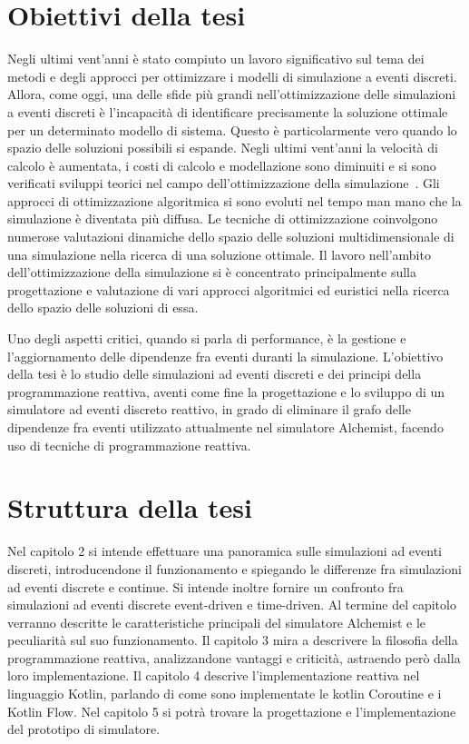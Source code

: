 \documentclass[12pt,a4paper,openright,twoside]{book}
\begin{document}
\section{Obiettivi della tesi}
Negli ultimi vent'anni è stato compiuto un lavoro significativo sul tema dei metodi e degli approcci per ottimizzare i modelli di simulazione a eventi discreti. Allora, come oggi, una delle sfide più grandi nell'ottimizzazione delle simulazioni a eventi discreti è l'incapacità di identificare precisamente la soluzione ottimale per un determinato modello di sistema. Questo è particolarmente vero quando lo spazio delle soluzioni possibili si espande.
Negli ultimi vent'anni la velocità di calcolo è aumentata, i costi di calcolo e modellazione sono diminuiti e si sono verificati sviluppi teorici nel campo dell'ottimizzazione della simulazione~\cite{DBLP:conf/scsc/Riley13}.
Gli approcci di ottimizzazione algoritmica si sono evoluti nel tempo man mano che la simulazione è diventata più diffusa. Le tecniche di ottimizzazione coinvolgono numerose valutazioni dinamiche dello spazio delle soluzioni multidimensionale di una simulazione nella ricerca di una soluzione ottimale. Il lavoro nell'ambito dell'ottimizzazione della simulazione si è concentrato principalmente sulla progettazione e valutazione di vari approcci algoritmici ed euristici nella ricerca dello spazio delle soluzioni di essa.

Uno degli aspetti critici, quando si parla di performance, è la gestione e l'aggiornamento delle dipendenze fra eventi duranti la simulazione. 
L'obiettivo della tesi è lo studio delle simulazioni ad eventi discreti e dei principi della programmazione reattiva, aventi come fine la progettazione e lo sviluppo di un simulatore ad eventi discreto reattivo, in grado di eliminare il grafo delle dipendenze fra eventi utilizzato attualmente nel simulatore Alchemist, facendo uso di tecniche di programmazione reattiva. 

\section{Struttura della tesi}
Nel capitolo 2 si intende effettuare una panoramica sulle simulazioni ad eventi discreti, introducendone il funzionamento e spiegando le differenze fra simulazioni ad eventi discrete e continue. Si intende inoltre fornire un confronto fra simulazioni ad eventi discrete event-driven e time-driven. Al termine del capitolo verranno descritte le caratteristiche principali del simulatore Alchemist e le peculiarità sul suo funzionamento. 
Il capitolo 3 mira a descrivere la filosofia della programmazione reattiva, analizzandone vantaggi e criticità, astraendo però dalla loro implementazione. 
Il capitolo 4 descrive l'implementazione reattiva nel linguaggio Kotlin, parlando di come sono implementate le kotlin Coroutine e i Kotlin Flow. 
Nel capitolo 5 si potrà trovare la progettazione e l'implementazione del prototipo di simulatore. 
\end{document}
